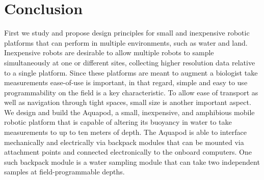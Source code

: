 



\section{Conclusion}
\label{sec:conclusion}

First we study and propose design principles for small and inexpensive robotic platforms that can perform in multiple environments, such as water and land. Inexpensive robots are desirable to allow multiple robots to sample simultaneously at one or different sites, collecting higher resolution data relative to a single platform. Since these platforms are meant to augment a biologist take measurements ease-of-use is important, in that regard, simple and easy to use programmability on the field is a key characteristic. To allow ease of transport as well as navigation through tight spaces, small size is another important aspect. We design and build the Aquapod, a small, inexpensive, and amphibious mobile robotic platform that is capable of altering its buoyancy in water to take measurements to up to ten meters of depth. The Aquapod is able to interface mechanically and electrically via backpack modules that can be mounted via attachment points and connected electronically to the onboard computers. One such backpack module is a water sampling module that can take two independent samples at field-programmable depths. 

